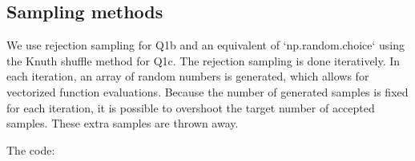 \subsection{Sampling methods}

We use rejection sampling for Q1b and an equivalent of `np.random.choice` using the Knuth shuffle method for Q1c.
The rejection sampling is done iteratively. In each iteration, an array of random numbers is generated, which
allows for vectorized function evaluations. Because the number of generated samples is fixed for each iteration,
it is possible to overshoot the target number of accepted samples. These extra samples are thrown away.

\noindent The code:
